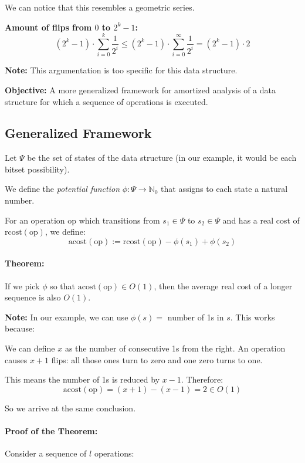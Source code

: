\documentclass{article}
\begin{document}
We can notice that this resembles a geometric series.

\medskip
\noindent
\textbf{Amount of flips from $0$ to $2^k - 1$:}
\[
(2^k - 1) \cdot \sum_{i=0}^{k} \frac{1}{2^i} 
\leq (2^k - 1) \cdot \sum_{i=0}^{\infty} \frac{1}{2^i} 
= (2^k - 1) \cdot 2
\]

\textbf{Note:} This argumentation is too specific for this data structure.

\medskip
\noindent
\textbf{Objective:} A more generalized framework for amortized analysis of a data structure for which a sequence of operations is executed.


\subsection{Generalized Framework}

Let $\Psi$ be the set of states of the data structure (in our example, it would be each bitset possibility).

We define the \emph{potential function} $\phi: \Psi \to \mathbb{N}_0$ that assigns to each state a natural number.

For an operation $\text{op}$ which transitions from $s_1 \in \Psi$ to $s_2 \in \Psi$ and has a real cost of $\text{rcost}(\text{op})$, we define:
\[
\text{acost}(\text{op}) := \text{rcost}(\text{op}) - \phi(s_1) + \phi(s_2)
\]


\paragraph{Theorem:} 
If we pick $\phi$ so that $\text{acost}(\text{op}) \in O(1)$, then the average real cost of a longer sequence is also $O(1)$.

\medskip
\noindent
\textbf{Note:} In our example, we can use $\phi(s) = $ number of 1s in $s$. This works because:

We can define $x$ as the number of consecutive 1s from the right. An operation causes $x + 1$ flips: all those ones turn to zero and one zero turns to one.

This means the number of 1s is reduced by $x - 1$. Therefore:
\[
\text{acost}(\text{op}) = (x + 1) - (x - 1) = 2 \in O(1)
\]

So we arrive at the same conclusion.


\paragraph{Proof of the Theorem:}
Consider a sequence of $l$ operations:
\end{document}
